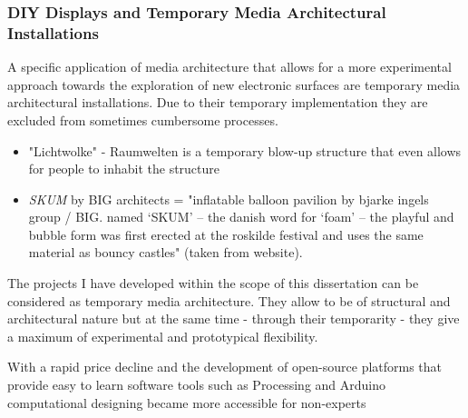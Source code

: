 



\subsubsection{DIY Displays and Temporary Media Architectural Installations}

A specific application of media architecture that allows for a more experimental approach towards the exploration of new electronic surfaces are temporary media architectural installations. Due to their temporary implementation they are excluded from sometimes cumbersome processes.

\begin{itemize}
\item "Lichtwolke" - Raumwelten  is a temporary blow-up structure that even allows for people to inhabit the structure 
\item  \textit{SKUM}  by BIG architects = "inflatable balloon pavilion by bjarke ingels group / BIG. named ‘SKUM’ – the danish word for ‘foam’ – the playful and bubble form was first erected at the roskilde festival and uses the same material as bouncy castles" (taken from website).
\end{itemize}

The projects I have developed within the scope of this dissertation can be considered as temporary media architecture. They allow to be of structural and architectural nature but at the same time - through their temporarity - they give a maximum of experimental and prototypical flexibility. 


With a rapid price decline and the development of open-source platforms that provide easy to learn software tools such as Processing and Arduino computational designing became more accessible for non-experts 

